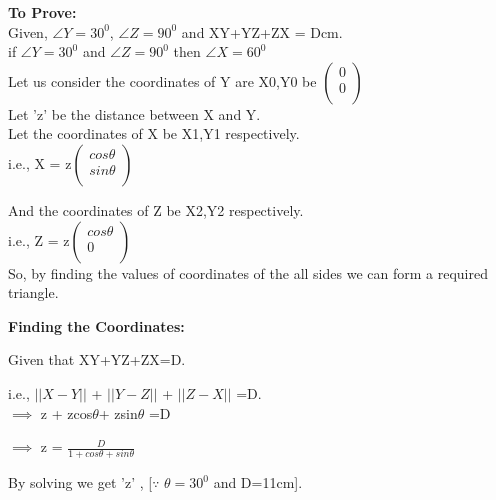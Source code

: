 \documentclass[10pt,a4paper]{report}
\begin{document}
\begin{multicols}{2}
\raggedright \textbf{To Prove:}\\ \vspace{3mm} 
   Given, $\angle{Y}=30^0$, $\angle{Z}=90^0$ and  XY+YZ+ZX = Dcm.\\ \vspace{1mm}
   if $\angle{Y}=30^0$ and $\angle{Z}=90^0$ then $\angle{X}=60^0$\\
   Let us consider the coordinates of Y are X0,Y0 be $\begin{pmatrix}
  0\\
  0 \\
 \end{pmatrix}$%
 \vspace{1mm} \\ Let 'z' be the distance between X and Y.
 \vspace{1mm} \\ Let the coordinates of X be X1,Y1 respectively.
  \\ \centering i.e., X = z$\begin{pmatrix}
  cos \theta\\
  sin \theta \\
 \end{pmatrix}$%
 \vspace{2mm}
  \\ \raggedright And the coordinates of Z be X2,Y2 respectively.
  \\ \centering i.e., Z = z$\begin{pmatrix}
  cos \theta\\
  0 \\
 \end{pmatrix}$%
 \vspace{2mm}  \\So, by finding the values of coordinates of the all sides we can form a required triangle. \\
\vspace{2mm}
\raggedright \textbf{Finding the Coordinates: } \\
        \raggedright Given that XY+YZ+ZX=D. \frenchspacing \\
        \raggedright i.e., $||X-Y||$ + $||Y-Z||$ + $||Z-X||$ =D. \\ \vspace{1mm}
 $\implies$ z + zcos$\theta$+ zsin$\theta$ =D\\  
	\begin{center}	
	$\implies$ z = $\frac{D}{1+cos\theta+sin\theta}$
	\end{center}
\centering By solving we get 'z' , [$\because$ $\theta=30^0$ and D=11cm].\\ \vspace{2mm}

\end{multicols}
\end{document}
